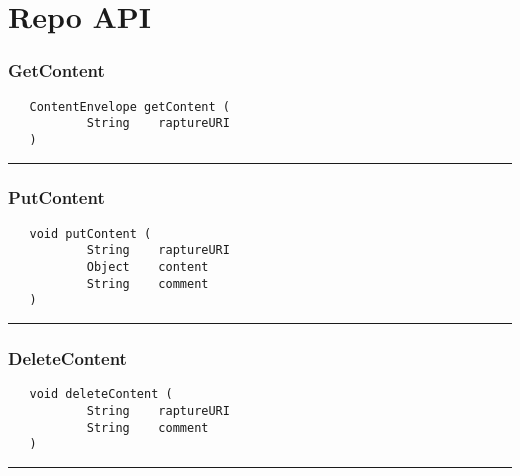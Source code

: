 \chapter{Repo API}

\subsection{GetContent}
\label{Api:GetContent}
\begin{verbatim}
   ContentEnvelope getContent (
           String    raptureURI
   )
\end{verbatim}



\rule{15cm}{2pt}
\subsection{PutContent}
\label{Api:PutContent}
\begin{verbatim}
   void putContent (
           String    raptureURI
           Object    content
           String    comment
   )
\end{verbatim}



\rule{15cm}{2pt}
\subsection{DeleteContent}
\label{Api:DeleteContent}
\begin{verbatim}
   void deleteContent (
           String    raptureURI
           String    comment
   )
\end{verbatim}



\rule{15cm}{2pt}
